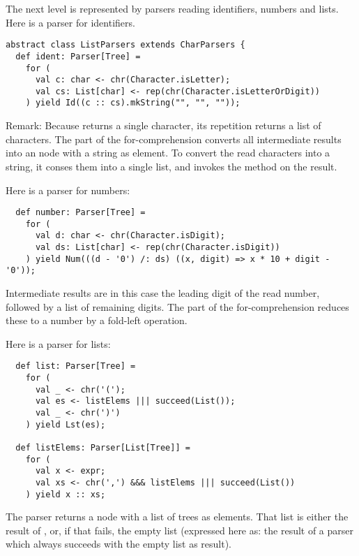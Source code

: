 {The next level is represented by parsers reading identifiers, numbers
and lists. Here is a parser for identifiers.
\begin{lstlisting}
abstract class ListParsers extends CharParsers {
  def ident: Parser[Tree] = 
    for (
      val c: char <- chr(Character.isLetter); 
      val cs: List[char] <- rep(chr(Character.isLetterOrDigit))
    ) yield Id((c :: cs).mkString("", "", ""));
\end{lstlisting}
Remark: Because  returns a single character, its
repetition  returns a list of characters. The
 part of the for-comprehension converts all intermediate
results into an  node with a string as element.  To convert
the read characters into a string, it conses them into a single list,
and invokes the  method on the result.

Here is a parser for numbers:
\begin{lstlisting}
  def number: Parser[Tree] =
    for (
      val d: char <- chr(Character.isDigit);
      val ds: List[char] <- rep(chr(Character.isDigit))
    ) yield Num(((d - '0') /: ds) ((x, digit) => x * 10 + digit - '0'));
\end{lstlisting}
Intermediate results are in this case the leading digit of
the read number, followed by a list of remaining digits.  The
 part of the for-comprehension reduces these to a number
by a fold-left operation.

Here is a parser for lists:
\begin{lstlisting}
  def list: Parser[Tree] = 
    for (
      val _ <- chr('(');
      val es <- listElems ||| succeed(List());
      val _ <- chr(')')
    ) yield Lst(es);

  def listElems: Parser[List[Tree]] = 
    for (
      val x <- expr;
      val xs <- chr(',') &&& listElems ||| succeed(List())
    ) yield x :: xs;
\end{lstlisting}
The  parser returns a  node with a list of trees
as elements.  That list is either the result of , or,
if that fails, the empty list (expressed here as: the result of a
parser which always succeeds with the empty list as result).

}
